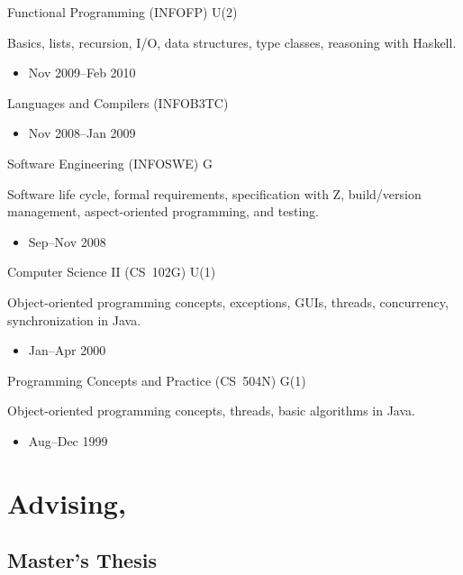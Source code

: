 \documentclass[11pt,a4paper,roman]{moderncv}
\begin{document}
\cventry%
{}%
{Functional Programming (INFOFP)}%
{\uu}%
{}%
{U(2)}%
{Basics, lists, recursion, I/O, data structures, type classes, reasoning with Haskell.
\begin{itemize}
\item Nov 2009--Feb 2010
\end{itemize}}

\cventry%
{}%
{Languages and Compilers (INFOB3TC)}%
{\uu}%
{}%
{}%
{\begin{itemize}
\item Nov 2008--Jan 2009
\end{itemize}}

\cventry%
{}%
{Software Engineering (INFOSWE)}%
{\uu}%
{}%
{G}%
{Software life cycle, formal requirements, specification with Z, build/version management, aspect-oriented programming, and testing.
\begin{itemize}
\item Sep--Nov 2008
\end{itemize}}

\cventry%
{}%
{Computer Science II (CS~102G)}%
{\wustl}%
{}%
{U(1)}%
{Object-oriented programming concepts, exceptions, GUIs, threads, concurrency, synchronization in Java.
\begin{itemize}
\item Jan--Apr 2000
\end{itemize}}

\cventry%
{}%
{Programming Concepts and Practice (CS~504N)}%
{\wustl}%
{}%
{G(1)}%
{Object-oriented programming concepts, threads, basic algorithms in Java.
\begin{itemize}
\item Aug--Dec 1999
\end{itemize}}


\section{Advising, \uu}

\subsection{Master's Thesis}

\end{document}
